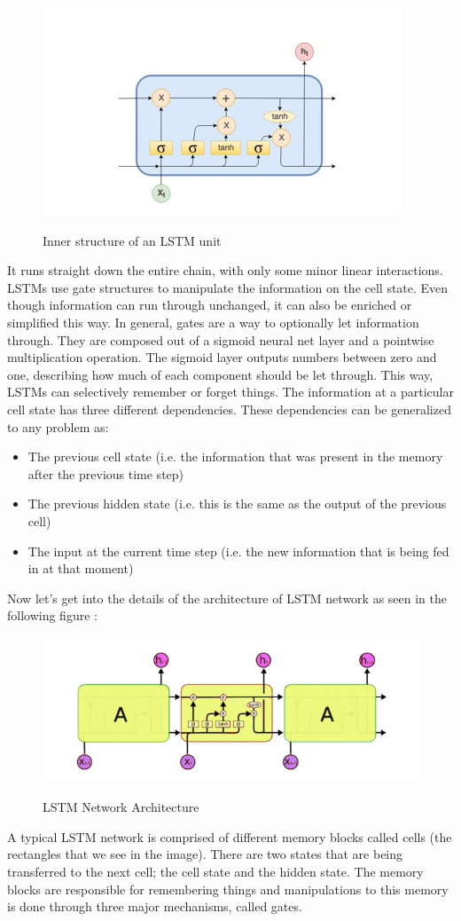 \begin{figure}[h!]
\centering
\includegraphics[width=0.7\linewidth]{project/lstm.png}
\label{fig:felix}
\caption{Inner structure of an LSTM unit}
\end{figure}
It runs straight down the entire chain, with only some minor linear interactions. LSTMs use gate structures to manipulate the information on the cell state. Even though information can run through unchanged, it can also be enriched or simplified this way. In general, gates are a way to optionally let information through. They are composed out of a sigmoid neural net layer and a pointwise multiplication operation. The sigmoid layer outputs numbers between zero and one, describing how much of each component should be let through. This way, LSTMs can selectively remember or forget things. The information at a particular cell state has three different dependencies.
These dependencies can be generalized to any problem as:
\begin{itemize}
    \item The previous cell state (i.e. the information that was present in the memory after the previous time step)
    \item The previous hidden state (i.e. this is the same as the output of the previous cell)
    \item The input at the current time step (i.e. the new information that is being fed in at that moment)
\end{itemize}
\par Now let’s get into the details of the architecture of LSTM network as seen in the following figure \cite{olah2015understanding}:
\begin{figure}[h!]
\centering
\includegraphics[width=1\linewidth]{project/archi.png}
\label{fig:felix}
\caption{LSTM Network Architecture}
\end{figure}
 A typical LSTM network is comprised of different memory blocks called cells (the rectangles that we see in the image).  There are two states that are being transferred to the next cell; the cell state and the hidden state. The memory blocks are responsible for remembering things and manipulations to this memory is done through three major mechanisms, called gates.

